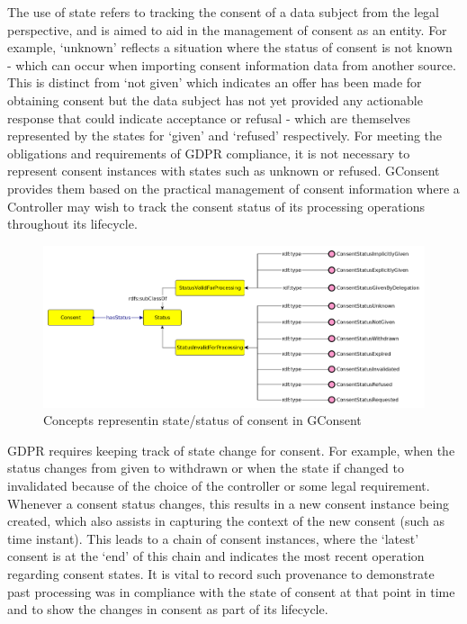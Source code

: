 The use of state refers to tracking the consent of a data subject from the legal perspective, and is aimed to aid in the management of consent as an entity. For example, `unknown' reflects a situation where the status of consent is not known - which can occur when importing consent information data from another source.
This is distinct from `not given' which indicates an offer has been made for obtaining consent but the data subject has not yet provided any actionable response that could indicate acceptance or refusal - which are themselves represented by the states for `given' and `refused' respectively.
For meeting the obligations and requirements of GDPR compliance, it is not necessary to represent consent instances with states such as unknown or refused.
GConsent provides them based on the practical management of consent information where a Controller may wish to track the consent status of its processing operations throughout its lifecycle.
\begin{figure}[htbp]
    \centering
    \includegraphics[width=\linewidth]{img/gconsent_status.png}
    \caption{Concepts representin state/status of consent in GConsent \cite{}}
    \label{fig:vocabs:gconsent-status}
\end{figure}

GDPR requires keeping track of state change for consent. For example, when the status changes from given to withdrawn or when the state if changed to invalidated because of the choice of the controller or some legal requirement. Whenever a consent status changes, this results in a new consent instance being created, which also assists in capturing the context of the new consent (such as time instant). This leads to a chain of consent instances, where the `latest' consent is at the `end' of this chain and indicates the most recent operation regarding consent states. It is vital to record such provenance to demonstrate past processing was in compliance with the state of consent at that point in time and to show the changes in consent as part of its lifecycle.

